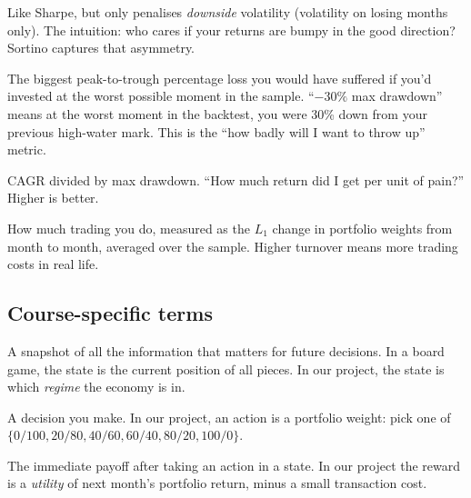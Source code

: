 \documentclass[11pt]{article}
\begin{document}
\begin{definition}
Like Sharpe, but only penalises \emph{downside} volatility (volatility on losing months only). The intuition: who cares if your returns are bumpy in the good direction? Sortino captures that asymmetry.
\end{definition}

\begin{definition}
The biggest peak-to-trough percentage loss you would have suffered if you'd invested at the worst possible moment in the sample. ``$-30\%$ max drawdown'' means at the worst moment in the backtest, you were 30\% down from your previous high-water mark. This is the ``how badly will I want to throw up'' metric.
\end{definition}

\begin{definition}
CAGR divided by max drawdown. ``How much return did I get per unit of pain?'' Higher is better.
\end{definition}

\begin{definition}[Turnover]
How much trading you do, measured as the $L_1$ change in portfolio weights from month to month, averaged over the sample. Higher turnover means more trading costs in real life.
\end{definition}

\subsection{Course-specific terms}

\begin{definition}[State]
A snapshot of all the information that matters for future decisions. In a board game, the state is the current position of all pieces. In our project, the state is which \emph{regime} the economy is in.
\end{definition}

\begin{definition}[Action]
A decision you make. In our project, an action is a portfolio weight: pick one of $\{0/100, 20/80, 40/60, 60/40, 80/20, 100/0\}$.
\end{definition}

\begin{definition}[Reward]
The immediate payoff after taking an action in a state. In our project the reward is a \emph{utility} of next month's portfolio return, minus a small transaction cost.
\end{definition}
\end{document}

